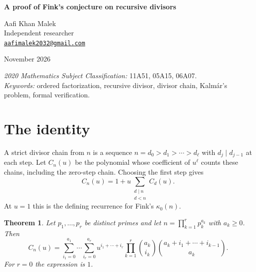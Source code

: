 \documentclass[11pt,letterpaper]{article}
\newtheorem{theorem}{Theorem}
\begin{document}
\begin{center}
{\Large\bfseries A proof of Fink's conjecture on recursive divisors\par}
\medskip
Aafi Khan Malek\\
Independent researcher\\
\href{mailto:aafimalek2032@gmail.com}{\texttt{aafimalek2032@gmail.com}}\par
{} November 2026
\end{center}

\begin{abstract}
We prove Conjecture 1 of T.~M.~A.~Fink's 2023 preprint on ordered
factorizations and recursive divisors. The conjectured binomial sum also
admits a nonnegative refinement that counts strict divisor chains by length.
We prove the refinement by direct counting and by formal power series.
The power series proof is formalized in Lean~4 with mathlib.
\end{abstract}

\noindent\textit{2020 Mathematics Subject Classification:} 11A51, 05A15, 06A07.\\
\textit{Keywords:} ordered factorization, recursive divisor, divisor chain,
Kalm\'ar's problem, formal verification.

\section{The identity}

A strict divisor chain from $n$ is a sequence $n=d_0>d_1>\cdots>d_\ell$
with $d_j\mid d_{j-1}$ at each step. Let $C_n(u)$ be the polynomial whose
coefficient of $u^\ell$ counts these chains, including the zero-step chain.
Choosing the first step gives
\begin{equation}
C_n(u)=1+u\sum_{\substack{d\mid n\\d<n}} C_d(u).
\label{eq:recurrence}
\end{equation}
At $u=1$ this is the defining recurrence for Fink's $\kappa_0(n)$.

\begin{theorem}
Let $p_1,\ldots,p_r$ be distinct primes and let
$n=\prod_{k=1}^r p_k^{a_k}$ with $a_k\ge 0$. Then
\begin{equation}
C_n(u)=
\sum_{i_1=0}^{a_1}\cdots\sum_{i_r=0}^{a_r}
u^{i_1+\cdots+i_r}
\prod_{k=1}^r\binom{a_k}{i_k}\binom{a_k+i_1+\cdots+i_{k-1}}{a_k}.
\label{eq:main}
\end{equation}
For $r=0$ the expression is $1$.
\end{theorem}
\end{document}
